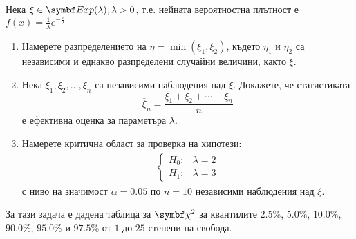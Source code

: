 \documentclass{../../common/topic}
\begin{document}
\begin{problem}\label{ex:se_summer2011}
  Нека \( \xi \in \distr{Exp}(\lambda), \lambda > 0 \), т.е. нейната вероятностна плътност е \( f(x) = \frac 1 \lambda e^{-\frac x \lambda} \)
  \begin{enumerate}[label=\alph*)]
    \item Намерете разпределението на \( \eta = \min(\xi_1, \xi_2) \), където \( \eta_1 \) и \( \eta_2 \) са независими и еднакво разпределени случайни величини, както \( \xi \).

    \item Нека \( \xi_1, \xi_2, \ldots, \xi_n \) са независими наблюдения над \( \xi \). Докажете, че статистиката
    \begin{equation*}
      \overline \xi_n = \frac {\xi_1 + \xi_2 + \cdots + \xi_n} n
    \end{equation*}
    е ефективна оценка за параметъра \( \lambda \).

    \item Намерете критична област за проверка на хипотези:
    \begin{align*}
      \begin{cases}
        H_0: &\lambda = 2 \\
        H_1: &\lambda = 3
      \end{cases}
    \end{align*}
    с ниво на значимост \( \alpha = 0.05 \) по \( n = 10 \) независими наблюдения над \( \xi \).
  \end{enumerate}
\end{problem}

\begin{remark}
  За тази задача е дадена таблица за \( \distr{\chi^2} \) за квантилите \( 2.5\% \), \( 5.0\% \), \( 10.0\% \), \( 90.0\% \), \( 95.0\% \) и \( 97.5\% \) от \( 1 \) до \( 25 \) степени на свобода.
\end{remark}
\end{document}
